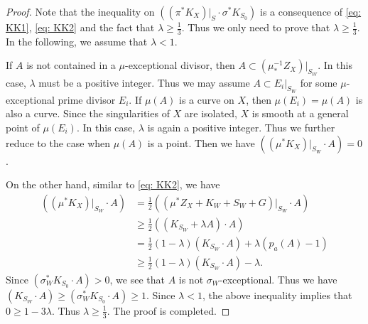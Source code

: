 \documentclass[a4paper,11pt]{amsart}
\theoremstyle{definition}
\theoremstyle{remark}
\numberwithin{equation}{section}
\begin{document}
\begin{proof}
	Note that the inequality on $\left((\pi^*K_X)|_S \cdot \sigma^*K_{S_0}\right)$ is a consequence of \eqref{eq: KK1}, \eqref{eq: KK2} and the fact that $\lambda \ge \frac{1}{3}$. Thus we only need to prove that $\lambda \ge \frac{1}{3}$. In the following, we assume that $\lambda < 1$.
	
	If $A$ is not contained in a $\mu$-exceptional divisor, then $A \subset (\mu^{-1}_*Z_X)|_{S_W}$. In this case, $\lambda$ must be a positive integer. Thus we may assume $A \subset E_i|_{S_W}$ for some $\mu$-exceptional prime divisor $E_i$. If $\mu(A)$ is a curve on $X$, then $\mu(E_i) = \mu(A)$ is also a curve. Since the singularities of $X$ are isolated, $X$ is smooth at a general point of $\mu(E_i)$. In this case, $\lambda$ is again a positive integer. Thus we further reduce to the case when $\mu(A)$ is a point. Then we have $\left((\mu^*K_X)|_{S_W} \cdot A\right) = 0$. 
	
	On the other hand, similar to \eqref{eq: KK2}, we have
	\begin{align*}
		\left((\mu^*K_X)|_{S_W} \cdot A \right) & =  \frac{1}{2} \left((\mu^*Z_X + K_W + S_W + G)|_{S_W} \cdot A\right) \\
		& \ge \frac{1}{2} ((K_{S_W} + \lambda A) \cdot A) \\
		& = \frac{1}{2} (1-\lambda) (K_{S_W}\cdot A) + \lambda(p_a(A) - 1) \\
		& \ge \frac{1}{2} (1-\lambda) (K_{S_W}\cdot A) - \lambda.
	\end{align*}
	Since $(\sigma_W^*K_{S_0} \cdot A) > 0$, we see that $A$ is not $\sigma_W$-exceptional. Thus we have $(K_{S_W} \cdot A)\ge (\sigma_W^*K_{S_0} \cdot A)\ge 1$. Since $\lambda < 1$, the above inequality implies that $0 \ge 1 - 3\lambda$. Thus $\lambda\ge\frac{1}{3}$. The proof is completed.
\end{proof}
\end{document}
